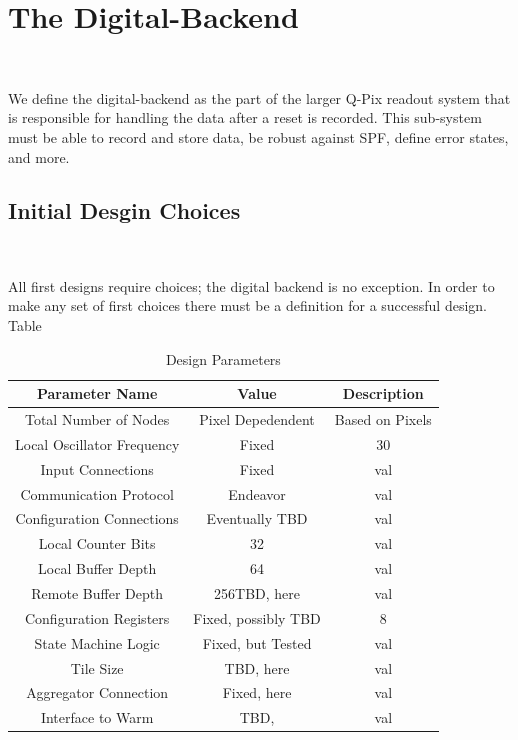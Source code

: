 \section{The Digital-Backend}~\label{sec:digital_backend}

We define the digital-backend as the part of the larger Q-Pix readout system that is responsible for handling the data after a reset is recorded.
This sub-system must be able to record and store data, be robust against SPF, define error states, and more.

\subsection{Initial Desgin Choices}~\label{sec:design_choices}

All first designs require choices; the digital backend is no exception.
In order to make any set of first choices there must be a definition for a successful design.
Table

\begin{table}
\begin{center}
\begin{tabular}{||c c c||}
 \hline
 Parameter Name & Value & Description \\ 
 \hline\hline
Total Number of Nodes & Pixel Depedendent & Based on Pixels \\
 \hline
Local Oscillator Frequency & Fixed & 30 \\
 \hline
Input Connections & Fixed & val \\
 \hline
Communication Protocol & Endeavor & val \\
 \hline
Configuration Connections & Eventually TBD & val \\
 \hline
Local Counter Bits & 32 & val \\
 \hline
Local Buffer Depth & 64 & val \\
 \hline
Remote Buffer Depth & 256TBD, here & val \\
 \hline
Configuration Registers & Fixed, possibly TBD & 8 \\
 \hline
State Machine Logic & Fixed, but Tested & val \\
 \hline
Tile Size & TBD, here & val \\
 \hline
Aggregator Connection & Fixed, here & val \\
 \hline
Interface to Warm & TBD, & val \\
 \hline
 \hline
\end{tabular}
\caption{Design Parameters}
\end{center}
\end{table}
~\label{table:digital_design_params}


